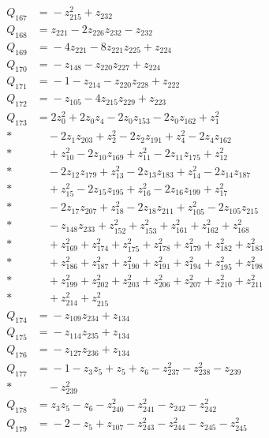 \begin{align*}
Q_{167} &={}-z_{215}^{2} + z_{232}\\[4pt]
Q_{168} &={}z_{221} - 2z_{226}z_{232} - z_{232}\\[4pt]
Q_{169} &={}-4z_{221} - 8z_{221}z_{225} + z_{224}\\[4pt]
Q_{170} &={}-z_{148} - z_{220}z_{227} + z_{224}\\[4pt]
Q_{171} &={}-1 - z_{214} - z_{220}z_{228} + z_{222}\\[4pt]
Q_{172} &={}-z_{105} - 4z_{215}z_{229} + z_{223}\\[4pt]
Q_{173} &={}2z_{0}^{2} + 2z_{0}z_{4} - 2z_{0}z_{153} - 2z_{0}z_{162} + z_{1}^{2}\\*
&\quad{} - 2z_{1}z_{203} + z_{2}^{2} - 2z_{2}z_{191} + z_{4}^{2} - 2z_{4}z_{162}\\*
&\quad{} + z_{10}^{2} - 2z_{10}z_{169} + z_{11}^{2} - 2z_{11}z_{175} + z_{12}^{2}\\*
&\quad{} - 2z_{12}z_{179} + z_{13}^{2} - 2z_{13}z_{183} + z_{14}^{2} - 2z_{14}z_{187}\\*
&\quad{} + z_{15}^{2} - 2z_{15}z_{195} + z_{16}^{2} - 2z_{16}z_{199} + z_{17}^{2}\\*
&\quad{} - 2z_{17}z_{207} + z_{18}^{2} - 2z_{18}z_{211} + z_{105}^{2} - 2z_{105}z_{215}\\*
&\quad{} - z_{148}z_{233} + z_{152}^{2} + z_{153}^{2} + z_{161}^{2} + z_{162}^{2} + z_{168}^{2}\\*
&\quad{} + z_{169}^{2} + z_{174}^{2} + z_{175}^{2} + z_{178}^{2} + z_{179}^{2} + z_{182}^{2} + z_{183}^{2}\\*
&\quad{} + z_{186}^{2} + z_{187}^{2} + z_{190}^{2} + z_{191}^{2} + z_{194}^{2} + z_{195}^{2} + z_{198}^{2}\\*
&\quad{} + z_{199}^{2} + z_{202}^{2} + z_{203}^{2} + z_{206}^{2} + z_{207}^{2} + z_{210}^{2} + z_{211}^{2}\\*
&\quad{} + z_{214}^{2} + z_{215}^{2}\\[4pt]
Q_{174} &={}-z_{109}z_{234} + z_{134}\\[4pt]
Q_{175} &={}-z_{114}z_{235} + z_{134}\\[4pt]
Q_{176} &={}-z_{127}z_{236} + z_{134}\\[4pt]
Q_{177} &={}-1 - z_{3}z_{5} + z_{5} + z_{6} - z_{237}^{2} - z_{238}^{2} - z_{239}\\*
&\quad{} - z_{239}^{2}\\[4pt]
Q_{178} &={}z_{3}z_{5} - z_{6} - z_{240}^{2} - z_{241}^{2} - z_{242} - z_{242}^{2}\\[4pt]
Q_{179} &={}-2 - z_{5} + z_{107} - z_{243}^{2} - z_{244}^{2} - z_{245} - z_{245}^{2}\\[4pt]

\end{align*}

